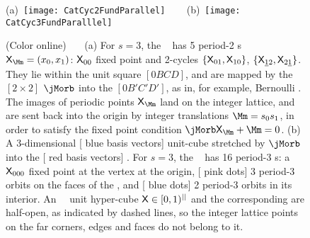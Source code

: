 \begin{figure}
  \centering
(a)~\texttt{[image: CatCyc2FundParallel]}%
~~~
(b)~\texttt{[image: CatCyc3FundParalllel]}%
  \caption{\label{fig:catCycJacob}
    (Color online)~~~
(a)
    For $s=3$, the \templatt\  has 5 period-2
    {\lattstate}s $\Xx_\Mm=(\ssp_0,\ssp_1)$: $\mathsf{X}_{00}$ fixed point and
    2-cycles $\{\mathsf{X}_{01},\mathsf{X}_{10}\}$,
    $\{\mathsf{X}_{\underline{1}2},\mathsf{X}_{2\underline{1}}\}$. They lie
    within the unit square $[0BCD]$, and are mapped by the
    $[2\!\times\!2]$ {\jacobianOrb} $\jMorb$  into the
    {\fundPip} $[0B'C'D']$, as in, for example, Bernoulli
    . The images of periodic points $\Xx_\Mm$
    land on the integer lattice, and are sent back into the origin by
    integer translations $\Mm= \Ssym{0}\Ssym{1}$, in order to satisfy the
    fixed point condition
    $\jMorb\Xx_\Mm+\Mm=0$.
(b) A 3-dimensional [{\color{blue} blue} basis vectors] unit-cube stretched by
    $\jMorb$  into the [{\color{red} red} basis vectors]
    {\fundPip}. For $s=3$, the \templatt\
     has 16 period-3 {\lattstate}s: a $\mathsf{X}_{000}$
    fixed point at the vertex at the origin, [{\color{red} pink dots}] 3
    period-3 orbits on the faces of the {\fundPip}, and
    [{\color{blue} blue dots}] 2 period-3 orbits in its interior.
    An \cl{}\dmn\ \statesp\ unit hyper-cube $\mathsf{X}\in[0,1)^{||}$ and the
    corresponding {\fundPip} are half-open, as indicated
    by dashed lines, so the integer lattice points on the far corners, edges
    and faces do not belong to it.
}
\end{figure}

